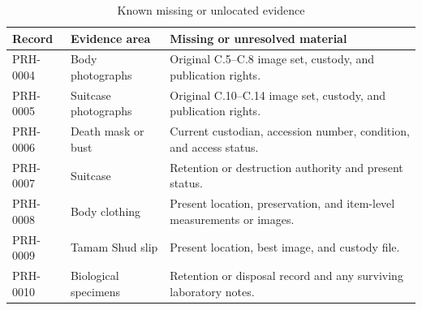 \begin{table}[htbp]
\centering
\caption{Known missing or unlocated evidence}
\label{tab:known-missing-evidence-ch6}
\begin{tabularx}{\textwidth}{>{\raggedright\arraybackslash}p{}>{\raggedright\arraybackslash}p{}>{\raggedright\arraybackslash}X}
\toprule
Record & Evidence area & Missing or unresolved material \\
\midrule
PRH-0004 & Body photographs & Original C.5--C.8 image set, custody, and publication rights. \\
PRH-0005 & Suitcase photographs & Original C.10--C.14 image set, custody, and publication rights. \\
PRH-0006 & Death mask or bust & Current custodian, accession number, condition, and access status. \\
PRH-0007 & Suitcase & Retention or destruction authority and present status. \\
PRH-0008 & Body clothing & Present location, preservation, and item-level measurements or images. \\
PRH-0009 & Tamam Shud slip & Present location, best image, and custody file. \\
PRH-0010 & Biological specimens & Retention or disposal record and any surviving laboratory notes. \\
\bottomrule
\end{tabularx}
\end{table}

